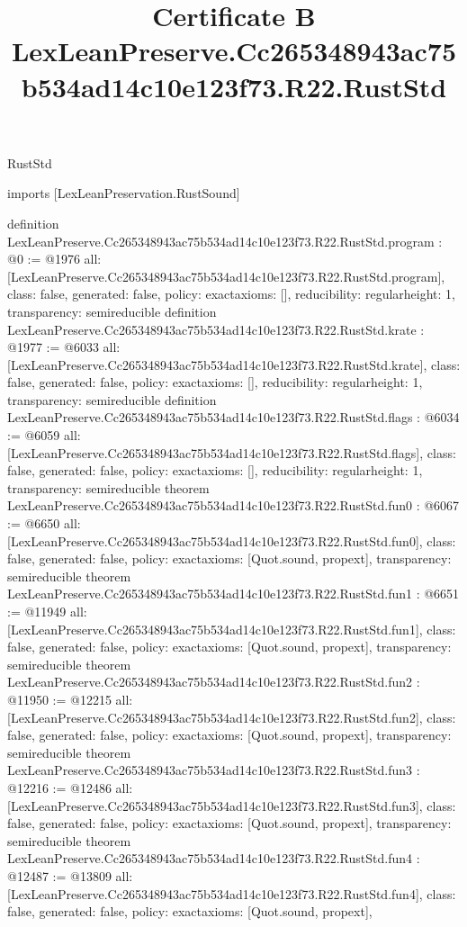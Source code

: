 \begin{lexlean}{RustStd}
\title{Certificate B LexLeanPreserve.Cc265348943ac75b534ad14c10e123f73.R22.RustStd}
\begin{coremodule}
imports [LexLeanPreservation.RustSound]

definition LexLeanPreserve.Cc265348943ac75b534ad14c10e123f73.R22.RustStd.program : @0 := @1976 {
  all: [LexLeanPreserve.Cc265348943ac75b534ad14c10e123f73.R22.RustStd.program],
  class: false,
  generated: false,
  policy: exact{axioms: []},
  reducibility: regular{height: 1},
  transparency: semireducible
}
definition LexLeanPreserve.Cc265348943ac75b534ad14c10e123f73.R22.RustStd.krate : @1977 := @6033 {
  all: [LexLeanPreserve.Cc265348943ac75b534ad14c10e123f73.R22.RustStd.krate],
  class: false,
  generated: false,
  policy: exact{axioms: []},
  reducibility: regular{height: 1},
  transparency: semireducible
}
definition LexLeanPreserve.Cc265348943ac75b534ad14c10e123f73.R22.RustStd.flags : @6034 := @6059 {
  all: [LexLeanPreserve.Cc265348943ac75b534ad14c10e123f73.R22.RustStd.flags],
  class: false,
  generated: false,
  policy: exact{axioms: []},
  reducibility: regular{height: 1},
  transparency: semireducible
}
theorem LexLeanPreserve.Cc265348943ac75b534ad14c10e123f73.R22.RustStd.fun0 : @6067 := @6650 {
  all: [LexLeanPreserve.Cc265348943ac75b534ad14c10e123f73.R22.RustStd.fun0],
  class: false,
  generated: false,
  policy: exact{axioms: [Quot.sound, propext]},
  transparency: semireducible
}
theorem LexLeanPreserve.Cc265348943ac75b534ad14c10e123f73.R22.RustStd.fun1 : @6651 := @11949 {
  all: [LexLeanPreserve.Cc265348943ac75b534ad14c10e123f73.R22.RustStd.fun1],
  class: false,
  generated: false,
  policy: exact{axioms: [Quot.sound, propext]},
  transparency: semireducible
}
theorem LexLeanPreserve.Cc265348943ac75b534ad14c10e123f73.R22.RustStd.fun2 : @11950 := @12215 {
  all: [LexLeanPreserve.Cc265348943ac75b534ad14c10e123f73.R22.RustStd.fun2],
  class: false,
  generated: false,
  policy: exact{axioms: [Quot.sound, propext]},
  transparency: semireducible
}
theorem LexLeanPreserve.Cc265348943ac75b534ad14c10e123f73.R22.RustStd.fun3 : @12216 := @12486 {
  all: [LexLeanPreserve.Cc265348943ac75b534ad14c10e123f73.R22.RustStd.fun3],
  class: false,
  generated: false,
  policy: exact{axioms: [Quot.sound, propext]},
  transparency: semireducible
}
theorem LexLeanPreserve.Cc265348943ac75b534ad14c10e123f73.R22.RustStd.fun4 : @12487 := @13809 {
  all: [LexLeanPreserve.Cc265348943ac75b534ad14c10e123f73.R22.RustStd.fun4],
  class: false,
  generated: false,
  policy: exact{axioms: [Quot.sound, propext]},
}
\end{coremodule}
\end{lexlean}
